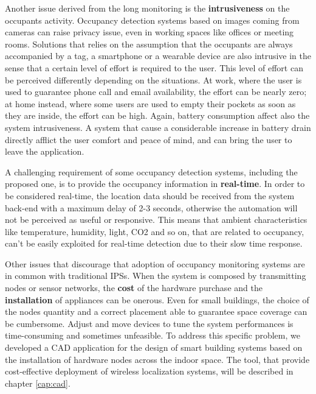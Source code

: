 \smallskip
Another issue derived from the long monitoring is the \textbf{intrusiveness} on the occupants activity. Occupancy detection systems based on images coming from cameras can raise privacy issue, even in working spaces like offices or meeting rooms.
Solutions that relies on the assumption that the occupants are always accompanied by a tag, a smartphone or a wearable device are also intrusive in the sense that a certain level of effort is required to the user. This level of effort can be perceived differently depending on the situations. At work, where the user is used to guarantee phone call and email availability, the effort can be nearly zero; at home instead, where some users are used to empty their pockets as soon as they are inside, the effort can be high.
Again, battery consumption affect also the system intrusiveness.
A system that cause a considerable increase in battery drain directly afflict the user comfort and peace of mind, and can bring the user to leave the application.

\smallskip
A challenging requirement of some occupancy detection systems, including the proposed one, is to provide the occupancy information in \textbf{real-time}. In order to be considered real-time, the location data should be received from the system back-end with a maximum delay of 2-3 seconds, otherwise the automation will not be perceived as useful or responsive. This means that ambient characteristics like temperature, humidity, light, CO2 and so on, that are related to occupancy, can't be easily exploited for real-time detection due to their slow time response. 

\smallskip
Other issues that discourage that adoption of occupancy monitoring systems are in common with traditional IPSs. When the system is composed by transmitting nodes or sensor networks, the \textbf{cost} of the hardware purchase and the \textbf{installation} of appliances can be onerous. Even for small buildings, the choice of the nodes quantity and a correct placement able to guarantee space coverage can be cumbersome. Adjust and move devices to tune the system performances is time-consuming and sometimes unfeasible. To address this specific problem, we developed a CAD application for the design of smart building systems based on the installation of hardware nodes across the indoor space. The tool, that provide cost-effective deployment of wireless localization systems, will be described in chapter \ref{cap:cad}.

